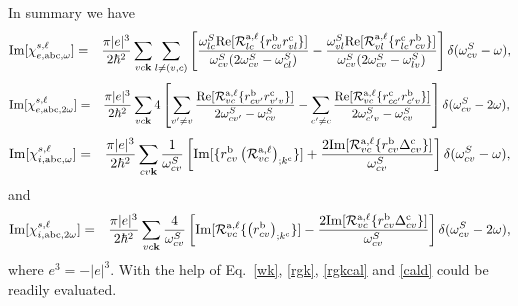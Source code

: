 In summary we have
\begin{eqnarray}\label{imchiew}
\mathrm{Im}[\chi_{e,\mathrm{a}\mathrm{b}\mathrm{c},\omega}^{s,\ell}]
&=&
\frac{\pi |e|^3}{2\hbar^2} 
\sum_{vc\mathbf{k}}
\sum_{l\neq(v,c)}
\left[
\frac{\omega^S_{lc}\mathrm{Re}[{\cal R}^{\mathrm{a},\ell}_{lc}\{r^{\mathrm{b}}_{cv}r^{\mathrm{c}}_{vl}\}]}
{\omega^S_{cv}(2\omega^S_{cv}-\omega^S_{cl})}
-
\frac{\omega^S_{vl}\mathrm{Re}[{\cal R}^{\mathrm{a},\ell}_{vl}\{r^{\mathrm{c}}_{lc}r^{\mathrm{b}}_{cv}\}]}
{\omega^S_{cv}(2\omega^S_{cv}-\omega^S_{lv})}
\right]
\delta(\omega^S_{cv}-\omega)
,
\end{eqnarray}  
\begin{eqnarray}\label{imchie2w}
\mathrm{Im}[\chi_{e,\mathrm{a}\mathrm{b}\mathrm{c},2\omega}^{s,\ell}]
&=&
\frac{\pi |e|^3}{2\hbar^2} 
\sum_{vc\mathbf{k}}
4
\left[
\sum_{v'\ne v}
\frac{\mathrm{Re}[{\cal
    R}^{\mathrm{a},\ell}_{vc}\{r^{\mathrm{b}}_{cv'}r^{\mathrm{c}}_{v'v}\}]}{2\omega^S_{cv'}-\omega^S_{cv}}
-
\sum_{c'\ne c}
\frac{\mathrm{Re}[{\cal R}^{\mathrm{a},\ell}_{vc}\{r^{\mathrm{c}}_{cc'}r^{\mathrm{b}}_{c'v}\}]}
{2\omega^S_{c'v}-\omega^S_{cv}}
\right]
\delta(\omega^S_{cv}-2\omega)
,
\end{eqnarray}  
\begin{eqnarray}\label{imchiwf}
\mathrm{Im}[\chi_{i,\mathrm{a}\mathrm{b}\mathrm{c},\omega}^{s,\ell}]
&=&
\frac{\pi|e|^3}{2\hbar^2}
\sum_{cv\mathbf{k}}
\frac{1}{\omega^S_{cv}}
\left[
\mathrm{Im}[\{r^{\mathrm{b}}_{cv}\left({\cal R}^{\mathrm{a},\ell}_{vc}\right)_{;k^{\mathrm{c}}}\}]
+
\frac{2\mathrm{Im}[{\cal R}^{\mathrm{a},\ell}_{vc}\{r^{\mathrm{b}}_{cv}\Delta^{\mathrm{c}}_{cv}\}]}{\omega^S_{cv}}
\right]
\delta(\omega^S_{cv}-\omega)
,
\end{eqnarray}
and
\begin{eqnarray}\label{imchi2wf}
\mathrm{Im}[\chi_{i,\mathrm{a}\mathrm{b}\mathrm{c},2\omega}^{s,\ell}]
&=&
\frac{\pi|e|^3}{2\hbar^2}\sum_{vc\mathbf{k}}
\frac{4}{\omega^S_{cv}}
\left[
\mathrm{Im}[{\cal R}^{\mathrm{a},\ell}_{vc}\{\left(r^{\mathrm{b}}_{cv}\right)_{;k^{\mathrm{c}}}\}]
-
\frac{2\mathrm{Im}[{\cal R}^{\mathrm{a},\ell}_{vc}\{r^{\mathrm{b}}_{cv}\Delta^{\mathrm{c}}_{cv}\}]}{\omega^S_{cv}}
\right]\delta(\omega^S_{cv}-2\omega)
,
\end{eqnarray}
where $e^3=-|e|^3$.
With the help of 
Eq.~\eqref{wk}, \eqref{rgk}, \eqref{rgkcal} and \eqref{cald} could be
readily evaluated.
